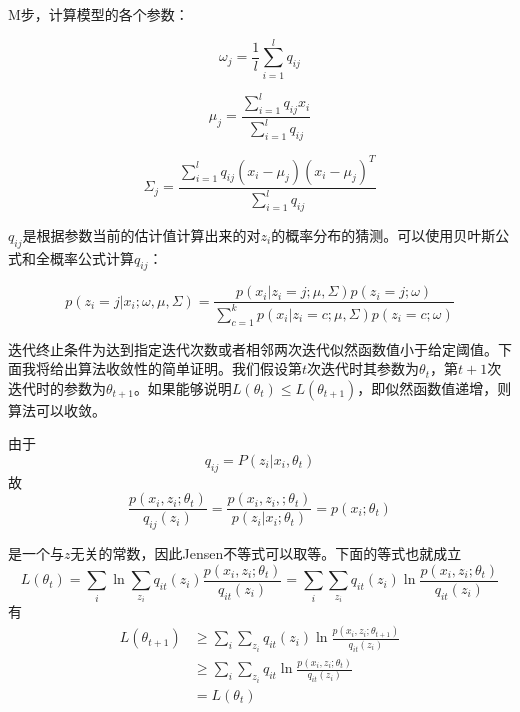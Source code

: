 \documentclass[a4paper,12pt,openany,oneside,utf-8]{ctexbook}
\begin{document}
    M步，计算模型的各个参数：
    
    \begin{equation}
        \omega_j=\frac{1}{l}\sum_{i=1}^l q_{i j}
    \end{equation}
    
    \begin{equation}
        \mu_j=\frac{\sum_{i=1}^l q_{i j}x_i}{\sum_{i=1}^l q_{i j}}
    \end{equation}
    
    \begin{equation}
        \Sigma_j=\frac{\sum_{i=1}^l q_{i j}(x_i-\mu_j)(x_i-\mu_j)^T}{\sum_{i=1}^l q_{i j}}
    \end{equation}
    
    $q_{i j}$是根据参数当前的估计值计算出来的对$z_i$的概率分布的猜测。可以使用贝叶斯公式和全概率公式计算$q_{i j}$：
    
    \begin{equation}
        p(z_i=j|x_i;\omega,\mu,\Sigma)=\frac{p(x_i|z_i=j;\mu,\Sigma)p(z_i=j;\omega)}{\sum_{c=1}^k p(x_i|z_i=c;\mu,\Sigma)p(z_i=c;\omega)}
    \end{equation}
    
    迭代终止条件为达到指定迭代次数或者相邻两次迭代似然函数值小于给定阈值。下面我将给出算法收敛性的简单证明。我们假设第$t$次迭代时其参数为$\theta_t$，第$t+1$次迭代时的参数为$\theta_{t+1}$。如果能够说明$L(\theta_t)\leq L(\theta_{t+1})$，即似然函数值递增，则算法可以收敛。
    
    由于
    \begin{equation}
        q_{i j}=P(z_i|x_i,\theta_t)
    \end{equation}
    故
    \begin{equation}
        \frac{p(x_i,z_i;\theta_t)}{q_{i j}(z_i)}=\frac{p(x_i,z_i,;\theta_t)}{p(z_i|x_i;\theta_t)}=p(x_i;\theta_t)
    \end{equation}
    
    是一个与$z$无关的常数，因此Jensen不等式可以取等。下面的等式也就成立
    \begin{equation}
        L(\theta_t)=\sum_i \ln\sum_{z_i}q_{i t}(z_i)\frac{p(x_i,z_i;\theta_t)}{q_{i t}(z_i)}=\sum_i\sum_{z_i}q_{it}(z_i)\ln \frac{p(x_i,z_i;\theta_t)}{q_{i t}(z_i)}
    \end{equation}
    有
    \begin{equation}
    \begin{aligned}
        L(\theta_{t+1}) & \geq \sum_i\sum_{z_i}q_{i t}(z_i)\ln \frac{p(x_i,z_i;\theta_{t+1})}{q_{it}(z_i)} \\ 
        & \geq \sum_i\sum_{z_i}q_{i t}\ln \frac{p(x_i,z_i;\theta_t)}{q_{i t}(z_i)} \\ 
        &=L(\theta_t)
    \end{aligned}
    \end{equation}
    
\end{document}
